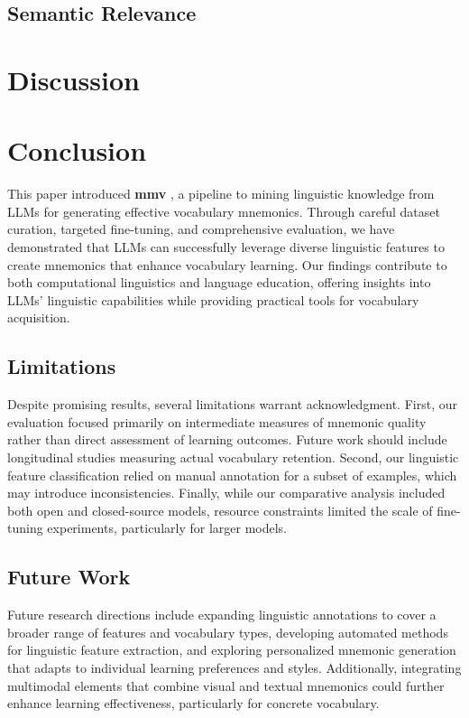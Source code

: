\documentclass{article}
\newcounter{para}
\newcommand{\shorttitle}{\textbf{mmv }}
\begin{document}
\subsection{Semantic Relevance} \label{sec:relevance-results}

\section{Discussion} \label{sec:discussion}


\section{Conclusion} \label{sec:conclusion}
This paper introduced \shorttitle, a pipeline to mining linguistic knowledge from LLMs for generating effective vocabulary mnemonics. Through careful dataset curation, targeted fine-tuning, and comprehensive evaluation, we have demonstrated that LLMs can successfully leverage diverse linguistic features to create mnemonics that enhance vocabulary learning. Our findings contribute to both computational linguistics and language education, offering insights into LLMs' linguistic capabilities while providing practical tools for vocabulary acquisition.

\subsection{Limitations}
Despite promising results, several limitations warrant acknowledgment. First, our evaluation focused primarily on intermediate measures of mnemonic quality rather than direct assessment of learning outcomes. Future work should include longitudinal studies measuring actual vocabulary retention. Second, our linguistic feature classification relied on manual annotation for a subset of examples, which may introduce inconsistencies. Finally, while our comparative analysis included both open and closed-source models, resource constraints limited the scale of fine-tuning experiments, particularly for larger models.

\subsection{Future Work}
Future research directions include expanding linguistic annotations to cover a broader range of features and vocabulary types, developing automated methods for linguistic feature extraction, and exploring personalized mnemonic generation that adapts to individual learning preferences and styles. Additionally, integrating multimodal elements that combine visual and textual mnemonics could further enhance learning effectiveness, particularly for concrete vocabulary.
\end{document}
